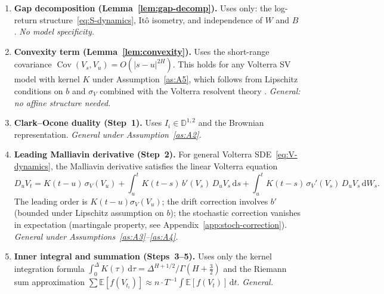 \documentclass[12pt]{article}
\theoremstyle{definition}
\DeclareMathOperator{\Cov}{Cov}
\newcommand{\E}{\mathbb{E}}
\newcommand{\dd}{\mathrm{d}}
\newcommand{\Dbb}{\mathbb{D}}
\begin{document}
\begin{enumerate}[label=\textbf{Step \arabic*:},leftmargin=3.5em]
\item \textbf{Gap decomposition (Lemma~\ref{lem:gap-decomp}).}
  Uses only: the log-return structure~\eqref{eq:S-dynamics},
  It\^o isometry, and independence of $W$ and $B$.
  \emph{No model specificity.}

\item \textbf{Convexity term (Lemma~\ref{lem:convexity}).}
  Uses the short-range covariance
  $\Cov(V_s, V_u) = O(|s{-}u|^{2H})$.
  This holds for any Volterra SV model with kernel $K$ under
  Assumption~\ref{as:A5}, which follows from Lipschitz conditions on
  $b$ and $\sigma_V$ combined with the Volterra resolvent theory
  \citep[cf.][]{GripenbergLondenStaffans1990,AbiJaberLarssonPulido2021}.
  \emph{General: no affine structure needed.}

\item \textbf{Clark--Ocone duality (Step~1).}
  Uses $I_i \in \Dbb^{1,2}$ and the Brownian representation.
  \emph{General under Assumption~\ref{as:A2}.}

\item \textbf{Leading Malliavin derivative (Step~2).}
  For general Volterra SDE~\eqref{eq:V-dynamics}, the Malliavin
  derivative satisfies the linear Volterra equation
  \begin{equation}\label{eq:DuVt-general-full}
    D_u V_t = K(t{-}u)\,\sigma_V(V_u)
    + \int_u^t K(t{-}s)\,b'(V_s)\,D_u V_s\,\dd s
    + \int_u^t K(t{-}s)\,\sigma_V'(V_s)\,D_u V_s\,\dd W_s.
  \end{equation}
  The leading order is $K(t{-}u)\sigma_V(V_u)$; the drift correction
  involves $b'$ (bounded under Lipschitz assumption on $b$); the
  stochastic correction vanishes in expectation (martingale property,
  see Appendix~\ref{app:stoch-correction}).
  \emph{General under Assumptions~\ref{as:A3}--\ref{as:A4}.}

\item \textbf{Inner integral and summation (Steps~3--5).}
  Uses only the kernel integration formula
  $\int_0^\Delta K(\tau)\,\dd\tau
  = \Delta^{H+1/2}/\Gamma(H+\tfrac32)$
  and the Riemann sum approximation $\sum \E[f(V_{t_i})] \approx
  n\cdot T^{-1}\!\int\!\E[f(V_t)]\,\dd t$.
  \emph{General.}
\end{enumerate}
\end{document}
